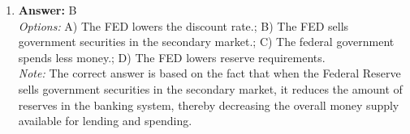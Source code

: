 \documentclass[12pt]{article}
\begin{document}
\begin{enumerate}[label=\arabic*.]
\\ \textit{Note:} A price floor is set above the equilibrium price to ensure that prices do not fall below a certain level, which can lead to surpluses in the market.
\item \textbf{Answer:} B
\\ \textit{Options:} A) The FED lowers the discount rate.; B) The FED sells government securities in the secondary market.; C) The federal government spends less money.; D) The FED lowers reserve requirements.
\\ \textit{Note:} The correct answer is based on the fact that when the Federal Reserve sells government securities in the secondary market, it reduces the amount of reserves in the banking system, thereby decreasing the overall money supply available for lending and spending.
\end{enumerate}
\end{document}
